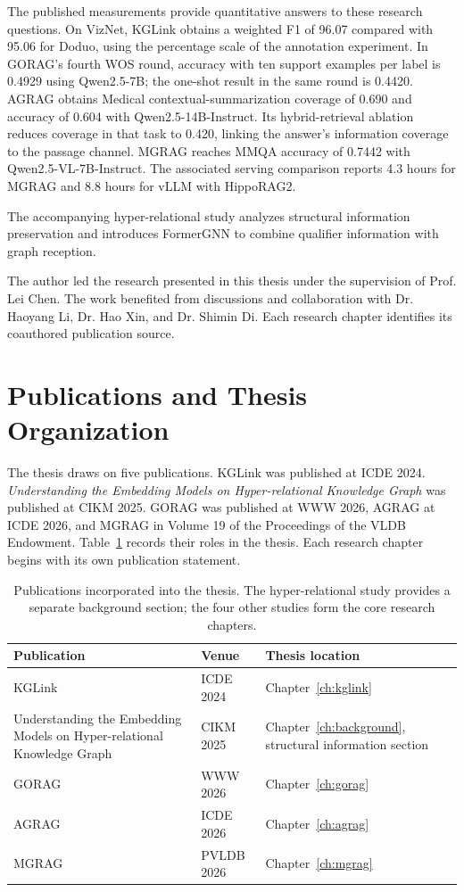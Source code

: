 The published measurements provide quantitative answers to these research questions. On VizNet, KGLink obtains a weighted F1 of 96.07 compared with 95.06 for Doduo, using the percentage scale of the annotation experiment. In GORAG's fourth WOS round, accuracy with ten support examples per label is 0.4929 using Qwen2.5-7B; the one-shot result in the same round is 0.4420. AGRAG obtains Medical contextual-summarization coverage of 0.690 and accuracy of 0.604 with Qwen2.5-14B-Instruct. Its hybrid-retrieval ablation reduces coverage in that task to 0.420, linking the answer's information coverage to the passage channel. MGRAG reaches MMQA accuracy of 0.7442 with Qwen2.5-VL-7B-Instruct. The associated serving comparison reports 4.3 hours for MGRAG and 8.8 hours for vLLM with HippoRAG2.

The accompanying hyper-relational study analyzes structural information preservation and introduces FormerGNN to combine qualifier information with graph reception.

The author led the research presented in this thesis under the supervision of Prof. Lei Chen. The work benefited from discussions and collaboration with Dr. Haoyang Li, Dr. Hao Xin, and Dr. Shimin Di. Each research chapter identifies its coauthored publication source.

\section{Publications and Thesis Organization}
\label{sec:introduction:organization}
The thesis draws on five publications. KGLink was published at ICDE 2024. \emph{Understanding the Embedding Models on Hyper-relational Knowledge Graph} was published at CIKM 2025. GORAG was published at WWW 2026, AGRAG at ICDE 2026, and MGRAG in Volume 19 of the Proceedings of the VLDB Endowment. Table~\ref{tab:introduction:publications} records their roles in the thesis. Each research chapter begins with its own publication statement.

\begin{table}[tbp]
\centering\small
\caption{Publications incorporated into the thesis. The hyper-relational study provides a separate background section; the four other studies form the core research chapters.}
\label{tab:introduction:publications}
\begin{tabular}{p{}p{}p{}}
\toprule
Publication & Venue & Thesis location\\
\midrule
KGLink~\cite{kglink-publication} & ICDE 2024 & Chapter~\ref{ch:kglink}\\
Understanding the Embedding Models on Hyper-relational Knowledge Graph~\cite{bg-hyperkg} & CIKM 2025 & Chapter~\ref{ch:background}, structural information section\\
GORAG~\cite{gorag-paper} & WWW 2026 & Chapter~\ref{ch:gorag}\\
AGRAG~\cite{agrag-paper} & ICDE 2026 & Chapter~\ref{ch:agrag}\\
MGRAG~\cite{mgrag-paper} & PVLDB 2026 & Chapter~\ref{ch:mgrag}\\
\bottomrule
\end{tabular}
\end{table}

